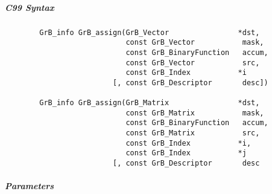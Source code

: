 \subparagraph{C99 Syntax}

\begin{verbatim}
        GrB_info GrB_assign(GrB_Vector                *dst,
                            const GrB_Vector           mask,
                            const GrB_BinaryFunction   accum,
                            const GrB_Vector           src,
                            const GrB_Index           *i
                         [, const GrB_Descriptor       desc])

        GrB_info GrB_assign(GrB_Matrix                *dst,
                            const GrB_Matrix           mask,
                            const GrB_BinaryFunction   accum,
                            const GrB_Matrix           src,
                            const GrB_Index           *i,
                            const GrB_Index           *j
                         [, const GrB_Descriptor       desc
\end{verbatim}

\subparagraph{Parameters}

